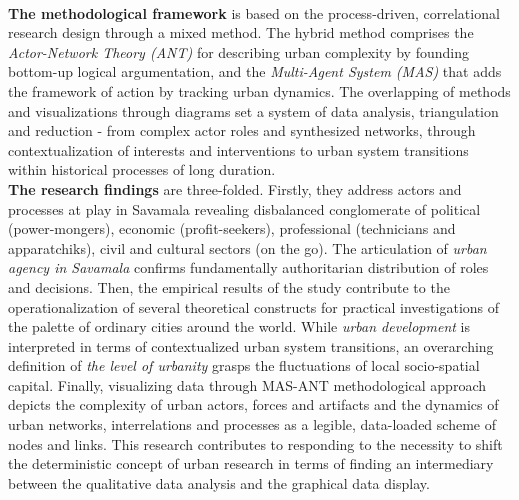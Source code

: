 \documentclass[11pt]{report}
\begin{document}
\\
\textbf{The methodological framework}  is based on the process-driven, correlational research design through a mixed method. The hybrid method  comprises the \textit{Actor-Network Theory (ANT)}
for describing  urban complexity by founding bottom-up logical argumentation,
and the \textit{Multi-Agent System (MAS)} that adds the framework of action by tracking urban dynamics.
The overlapping of methods and visualizations through diagrams set a system of data analysis, triangulation and reduction - from complex actor roles and synthesized networks, through contextualization of interests and interventions to urban system transitions within historical processes of long duration.
\\
\textbf{The research findings} are three-folded.
Firstly, they address actors and processes at play in Savamala revealing disbalanced conglomerate of  political (power-mongers), economic (profit-seekers), professional (technicians and apparatchiks), civil and cultural sectors (on the go).
The articulation of \textit{urban agency in Savamala} confirms fundamentally authoritarian distribution of roles and decisions.
Then, the empirical results of the study contribute to the operationalization of several
theoretical constructs for practical investigations of the palette of ordinary cities around the world.
While \textit{urban development} is interpreted in terms of contextualized urban system transitions, an overarching definition of \textit{the level of urbanity} grasps the fluctuations of local socio-spatial capital.
Finally, visualizing data through MAS-ANT methodological approach depicts the complexity of urban actors, forces and artifacts and the dynamics of urban networks, interrelations and processes as a legible, data-loaded scheme of nodes and links. 
This research contributes to responding to the necessity to shift the deterministic concept of  urban research
in terms of finding an intermediary between the qualitative data analysis and the graphical data display.

\cleardoublepage
\end{document}
